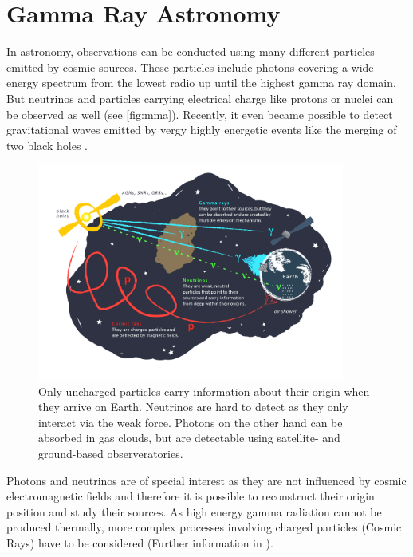 \chapter{Gamma Ray Astronomy}
In astronomy, observations can be conducted using many different particles emitted by cosmic sources. 
These particles include photons covering a wide energy spectrum from the lowest radio up until the highest gamma ray domain,
But neutrinos and particles carrying electrical charge like protons or nuclei can be observed as well (see \autoref{fig:mma}). 
Recently, it even became possible to detect gravitational waves emitted by vergy highly energetic events like the merging of two black holes \cite{PhysRevLett.116.061102}.
\begin{figure}
    \centering
    \includegraphics[width=0.9\textwidth]{images/cosmic_messengers.png}
    \caption{Only uncharged particles carry information about their origin when they arrive on Earth.
        Neutrinos are hard to detect as they only interact via the weak force.
        Photons on the other hand can be absorbed in gas clouds, but are detectable using satellite- and ground-based observeratories.
    }
    \label{fig:mma}
\end{figure}

Photons and neutrinos are of special interest as they are not influenced by cosmic electromagnetic fields and therefore it is possible to reconstruct their origin 
position and study their sources.
As high energy gamma radiation cannot be produced thermally, more complex processes involving charged particles (Cosmic Rays) have to be considered 
(Further information in \cite{s_funk}).

